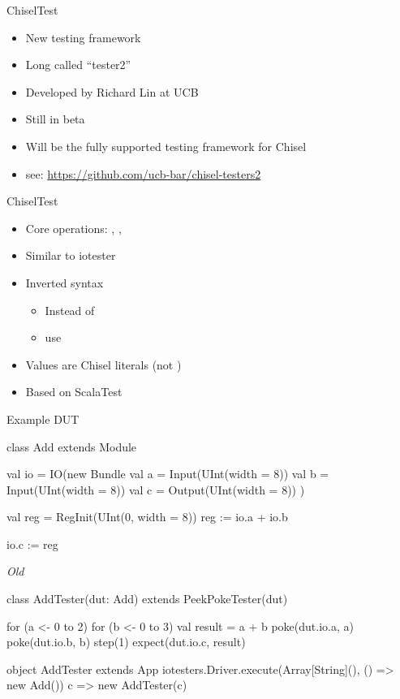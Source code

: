 \begin{frame}[fragile]{ChiselTest}
\begin{itemize}
\item New testing framework
\item Long called ``tester2''
\item Developed by Richard Lin at UCB
\item Still in beta
\item Will be the fully supported testing framework for Chisel
\item see: \url{https://github.com/ucb-bar/chisel-testers2}
\end{itemize}
\end{frame}

\begin{frame}[fragile]{ChiselTest}
\begin{itemize}
\item Core operations: , , 
\item Similar to iotester
\item Inverted syntax
\begin{itemize}
\item Instead of 
\item use 
\end{itemize}
\item Values are Chisel literals (not )
\item Based on ScalaTest
\end{itemize}
\end{frame}



\begin{frame}[fragile]{Example DUT}
\begin{chisel}
class Add extends Module {
  val io = IO(new Bundle {
    val a = Input(UInt(width = 8))
    val b = Input(UInt(width = 8))
    val c = Output(UInt(width = 8))
  })

  val reg = RegInit(UInt(0, width = 8))
  reg := io.a + io.b

  io.c := reg
}
\end{chisel}
\end{frame}

\begin{frame}[fragile]{\emph{Old} }
\begin{chisel}
class AddTester(dut: Add) extends PeekPokeTester(dut) {

  for (a <- 0 to 2) {
    for (b <- 0 to 3) {
      val result = a + b
      poke(dut.io.a, a)
      poke(dut.io.b, b)
      step(1)
      expect(dut.io.c, result)
    }
  }
}

object AddTester extends App {
  iotesters.Driver.execute(Array[String](), () => new Add()) { c => new AddTester(c) }
}
\end{chisel}
\end{frame}

